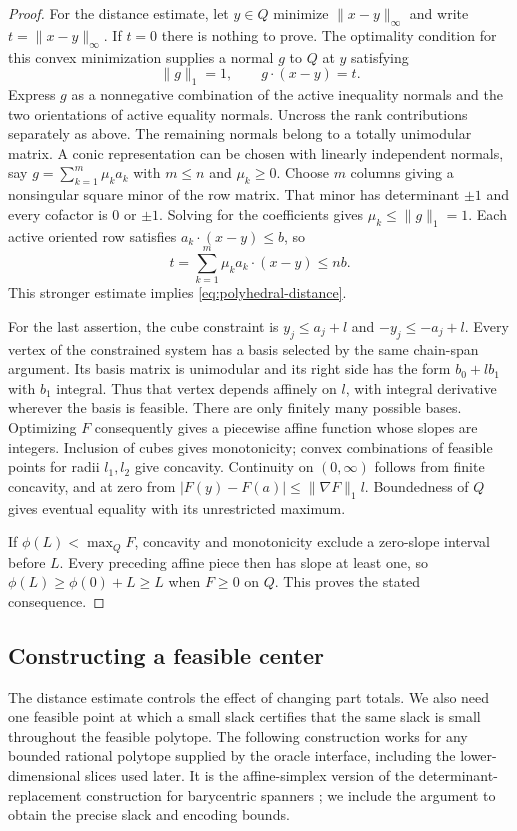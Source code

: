 \begin{proof}
For the distance estimate, let $y\in Q$ minimize $\|x-y\|_\infty$
and write $t=\|x-y\|_\infty$.  If $t=0$ there is nothing to prove.
The optimality condition for this convex minimization supplies a
normal $g$ to $Q$ at $y$ satisfying
\[
 \|g\|_1=1,\qquad g\cdot(x-y)=t.
\]
Express $g$ as a nonnegative combination of the active inequality
normals and the two orientations of active equality normals.
Uncross the rank contributions separately as above.  The remaining
normals belong to a totally unimodular matrix.  A conic representation
can be chosen with linearly independent normals, say
$g=\sum_{k=1}^m\mu_k a_k$ with $m\leq n$ and $\mu_k\geq0$.
Choose $m$ columns giving a nonsingular square minor of the row
matrix.  That minor has determinant $\pm1$ and every cofactor is
$0$ or $\pm1$.  Solving for the coefficients gives
$\mu_k\leq\|g\|_1=1$.  Each active oriented row satisfies
$a_k\cdot(x-y)\leq b$, so
\[
 t=\sum_{k=1}^m\mu_k a_k\cdot(x-y)\leq nb.
\]
This stronger estimate implies \eqref{eq:polyhedral-distance}.

For the last assertion, the cube constraint is
$y_j\leq a_j+l$ and $-y_j\leq-a_j+l$.
Every vertex of the constrained system has a basis selected by the
same chain-span argument.  Its basis matrix is unimodular and its
right side has the form $b_0+l b_1$ with $b_1$ integral.  Thus that
vertex depends affinely on $l$, with integral derivative wherever
the basis is feasible.  There are only finitely many possible bases.
Optimizing $F$ consequently gives a piecewise affine function whose
slopes are integers.  Inclusion of cubes gives monotonicity; convex
combinations of feasible points for radii $l_1,l_2$ give concavity.
Continuity on $(0,\infty)$ follows from finite concavity, and at zero
from $|F(y)-F(a)|\leq\|\nabla F\|_1l$.  Boundedness of $Q$ gives
eventual equality with its unrestricted maximum.

If $\phi(L)<\max_QF$, concavity and monotonicity exclude a
zero-slope interval before $L$.  Every preceding affine piece then
has slope at least one, so
$\phi(L)\geq\phi(0)+L\geq L$ when $F\geq0$ on $Q$.
This proves the stated consequence.
\end{proof}

\subsection{Constructing a feasible center}

The distance estimate controls the effect of changing part totals.
We also need one feasible point at which a small slack certifies that
the same slack is small throughout the feasible polytope.  The following
construction works for any bounded rational polytope supplied by the
oracle interface, including the lower-dimensional slices used later.
It is the affine-simplex version of the determinant-replacement
construction for barycentric spanners
\cite[Section 2.3 and Proposition 2.4]{AK2004}; we include the argument
to obtain the precise slack and encoding bounds.

